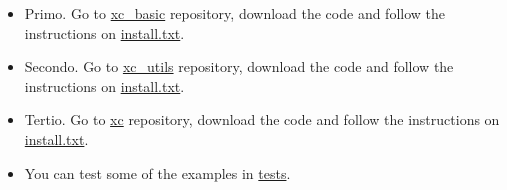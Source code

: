 \begin{itemize}
\item Primo. Go to \href{https://github.com/lcpt/xc_basic}{xc\_basic} repository, download the code and follow the instructions on \href{https://github.com/lcpt/xc_basic/blob/master/install.txt}{install.txt}.
\item Secondo. Go to \href{https://github.com/lcpt/xc_utils}{xc\_utils} repository, download the code and follow the instructions on \href{https://github.com/lcpt/xc_utils/blob/master/install.txt}{install.txt}.
\item Tertio. Go to \href{https://github.com/lcpt/xc}{xc} repository, download the code and follow the instructions on \href{https://github.com/lcpt/xc/blob/master/install.txt}{install.txt}.
\item You can test some of the examples in \href{https://github.com/lcpt/xc/tree/master/verif/tests}{tests}.
\end{itemize}







